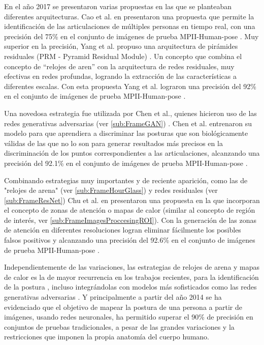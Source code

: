         En el año 2017 se presentaron varias propuestas en las que se planteaban diferentes arquitecturas. Cao et al. en \cite{Cao2017} presentaron una propuesta que permite la identificación de las articulaciones de múltiples personas en tiempo real, con una precisión del 75\% en el conjunto de imágenes de prueba MPII-Human-pose \cite{MPII2014}. Muy superior en la precisión, Yang et al. propuso una arquitectura de pirámides residuales (PRM - Pyramid Residual Module) \cite{Yang2017}. Un concepto que combina el concepto de ``relojes de aren'' con la arquitectura de redes residuales, muy efectivas en redes profundas, logrando la extracción de las características a diferentes escalas. Con esta propuesta Yang et al. \cite{Yang2017} lograron una precisión del 92\% en el conjunto de imágenes de prueba MPII-Human-pose \cite{MPII2014}.
        
        Una novedosa estrategia fue utilizada por Chen et al., quienes hicieron uso de las redes generativas adversarias (ver \ref{sub:FrameGAN}) \cite{Chen2017}. Chen et al. entrenaron su modelo para que aprendiera a discriminar las posturas que son biológicamente válidas de las que no lo son para generar resultados más precisos en la discriminación de los puntos correspondientes a las articulaciones, alcanzando una precisión del 92.1\% en el conjunto de imágenes de prueba MPII-Human-pose \cite{MPII2014}.
        
        Combinando estrategias muy importantes y de reciente aparición, como las de "relojes de arena" (ver \ref{sub:FrameHourGlass}) y redes residuales (ver \ref{sub:FrameResNet}) Chu et al. en \cite{Chu2017} presentaron una propuesta en la que incorporan el concepto de zonas de atención o mapas de calor (similar al concepto de región de interés, ver \ref{sub:FrameImagesProccesingROI}). Con la generación de las zonas de atención en diferentes resoluciones logran eliminar fácilmente los posibles falsos positivos y alcanzando una precisión del 92.6\% en el conjunto de imágenes de prueba MPII-Human-pose \cite{MPII2014}.
        
        Independientemente de las variaciones, las estrategias de relojes de arena y mapas de calor es la de mayor recurrencia en los trabajos recientes, para la identificación de la postura \cite{Tompson2015, Newell2016, Ning2018, Luvizon2019}, incluso integrándolas con modelos más sofisticados como las redes generativas adversarias \cite{Chou2018}. Y principalmente a partir del año 2014 se ha evidenciado que el objetivo de mapear la postura de una persona a partir de imágenes, usando redes neuronales, ha permitido superar el 90\% de precisión en conjuntos de pruebas tradicionales, a pesar de las grandes variaciones y la restricciones que imponen la propia anatomía del cuerpo humano.
        
